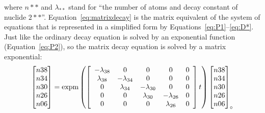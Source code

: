 \begin{refsection}
\noindent where $n\ast\ast$ and $\lambda_{\ast\ast}$ stand for ``the
number of atoms and decay constant of nuclide $2\ast\ast$''.
Equation~\ref{eq:matrixdecay} is the matrix equivalent of the system
of equations that is represented in a simplified form by
Equations~\ref{eq:P1}--\ref{eq:D*}.  Just like the ordinary decay
equation is solved by an exponential function (Equation~\ref{eq:P2}),
so the matrix decay equation is solved by a matrix exponential:
\begin{equation}
  \left[
    \begin{array}{@{}c@{}}
      n38\\
      n34\\
      n30\\
      n26\\
      n06
    \end{array}
  \right]
  =
  \mbox{expm}\left(
  \left[
    \begin{array}{ccccc}
      -\lambda_{38} & 0 & 0 & 0 & 0 \\
      \lambda_{38} & -\lambda_{34} & 0 & 0 & 0 \\
      0 & \lambda_{34} & -\lambda_{30} & 0 & 0 \\
      0 & 0 & \lambda_{30} & -\lambda_{26} & 0 \\
      0 & 0 & 0 & \lambda_{26} & 0\\
    \end{array}
    \right]
  t
  \right)
  \left[
    \begin{array}{@{}c@{}}
      n38\\
      n34\\
      n30\\
      n26\\
      n06
    \end{array}
    \right]_\circ
  \label{eq:matrixdecaysolution}
\end{equation}


\end{refsection}

